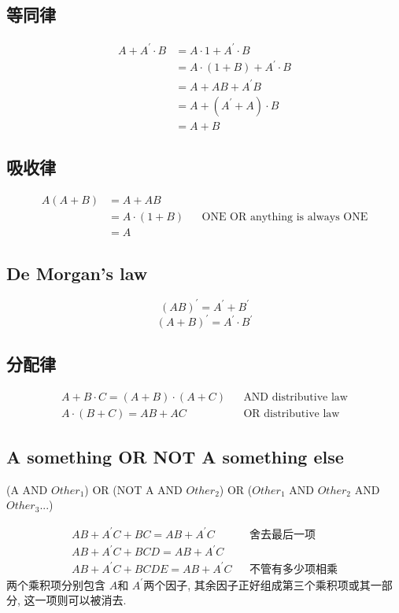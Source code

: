 \documentclass[scheme=chinese,a4paper]{report}
\begin{document}
\subsection{等同律}
\begin{align*}
    A+A^\prime\cdot B &= A\cdot 1+A^\prime\cdot B\\
    &=A\cdot(1+B)+A^\prime\cdot B\\
    &=A+AB+A^\prime B\\
    &=A+(A^\prime+A)\cdot B\\
    &=A+B
\end{align*}
\subsection{吸收律}
\begin{align*}
    A(A+B) &= A+AB\\
    &=A\cdot(1+B) && \text{ONE OR anything is always ONE}\\ 
    &=A
\end{align*}

\subsection{De Morgan's law}
$$(AB)^\prime=A^\prime+B^\prime$$
$$(A+B)^\prime=A^\prime\cdot B^\prime$$
\subsection{分配律}
\begin{align}
    A+B\cdot C=(A+B)\cdot (A+C) && \text{AND distributive law}\\
    A\cdot (B+C)=AB+AC && \text{OR distributive law}
\end{align}
\subsection{A something OR NOT A something else}
(A AND $Other_1$) OR (NOT A AND $Other_2$) OR ($Other_1$ AND $Other_2$ AND $Other_3$...)\par
\begin{align*}
    AB+A^\prime C+BC=AB+A^\prime C &&\text{舍去最后一项} \\
    AB+A^\prime C+BCD=AB+A^\prime C\\
    AB+A^\prime C+BCDE=AB+A^\prime C &&\text{不管有多少项相乘}
\end{align*}
两个乘积项分别包含 $ A $和 $ A ^\prime$两个因子, 其余因子正好组成第三个乘积项或其一部分, 这一项则可以被消去. 
\end{document}
